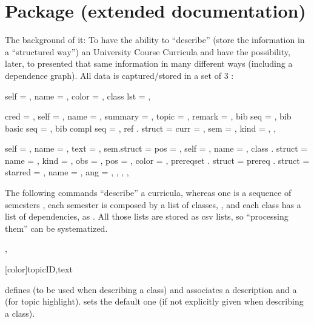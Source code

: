 \documentclass[article,nogeometry,english,tocdepth=3,secdepth=3]{ufrgscca} %
\begin{document}
\section{ Package (extended documentation)}
The background of it: To have the ability to “describe” (store the information in a “structured way”) an University Course Curricula and  have the possibility, later, to presented that same information in many different ways (including a dependence graph).  All data is captured/stored in a set of 3 :


\begin{codestore}[st=topicsdef]
  {
    self  = , name = , color = , class lst = , %
  }
\end{codestore}

\label{topics-def}


\begin{codestore}[st=classdef]
  {
   cred = , self = , name = , summary = , topic = , remark = ,
   bib seq = ,  bib basic seq = ,  bib compl seq = ,
   ref . struct = {
     curr = , sem = , kind = ,
   } ,
  }
\end{codestore}

\label{class-def}

\begin{codestore}[st=curriculadef]
  {
    self = , name = , text = ,
    sem.struct = {
      pos = , self = , name = ,
      class . struct = {
        name = , kind = , obs = , pos = , color = ,
        prereqset . struct = {
          prereq . struct = {
            starred = , name = , ang = ,
          }
        } ,
      } ,
    } ,
  }
\end{codestore}

\label{curricula-def}


The following commands “describe” a curricula, whereas one is a sequence of semesters , each semester is composed by a list of classes, , and each class has a list of dependencies,  as \tsmacro{\depdef}{}. All those lists are stored as csv lists, so “processing them” can be systematized.

\begin{codedescribe}{\topicdef,}
\begin{codesyntax}%
    \tsmacro{\topicdef}[color]{topicID,text}
\end{codesyntax}
\tsmacro{\topicdef}{} defines  (to be used when describing a class) and associates a  description and a  (for topic highlight).  sets the default one (if not explicitly given when describing a class).
\end{codedescribe}
\end{document}
